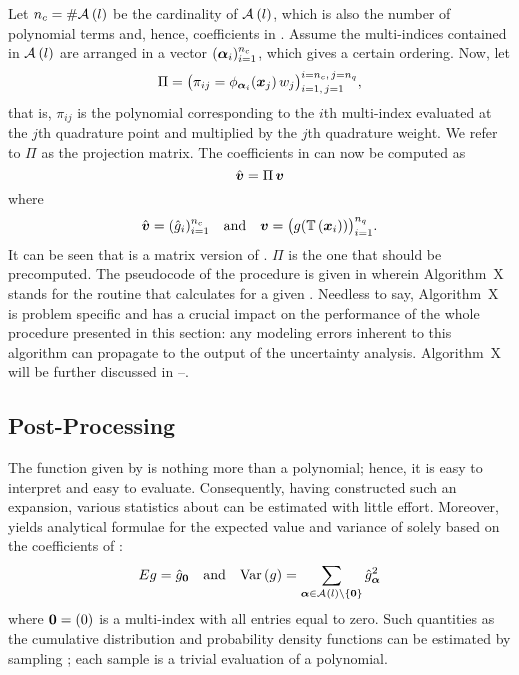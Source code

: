 Let ${n_{c}} = \# \mathcal{A}_{}\left(l\right)$ be the cardinality of
$\mathcal{A}_{}\left(l\right)$, which is also the number of polynomial terms and, hence,
coefficients in . Assume the multi-indices
contained in $\mathcal{A}_{}\left(l\right)$ are arranged in a vector $(\boldsymbol{\alpha}_i)_{i =
1}^{n_{c}}$, which gives a certain ordering. Now, let
\[
  \Pi = \big( \pi_{ij} = \phi_{\boldsymbol{\alpha}_i}(\boldsymbol{x}_j) \, w_j \big)_{i = 1, \, j = 1}^{i = {n_{c}}, \, j = {n_{q}}},
\]
that is, $\pi_{ij}$ is the polynomial corresponding to the $i$th multi-index
evaluated at the $j$th quadrature point and multiplied by the $j$th quadrature
weight. We refer to $\Pi$ as the projection matrix. The coefficients in
 can now be computed as
\[
  \hat{\boldsymbol{v}} = \Pi \, \boldsymbol{v}
\]
where
\[
  \hat{\v{v}} = (\hat{\g}_i)_{i = 1}^\nc \hspace{1em} \text{and} \hspace{1em}
  \v{v} = \big(\g(\transform{\v{x}_i}) \big)_{i = 1}^\nq.
\]
It can be seen that  is a matrix version of
. $\Pi$ is the one that should be precomputed. The
pseudocode of the procedure is given in  wherein
Algorithm~X stands for the routine that calculates \g for a given \vu. Needless
to say, Algorithm~X is problem specific and has a crucial impact on the
performance of the whole procedure presented in this section: any modeling
errors inherent to this algorithm can propagate to the output of the uncertainty
analysis. Algorithm~X will be further discussed in
--.

\subsection{Post-Processing}

The function given by  is nothing more than a
polynomial; hence, it is easy to interpret and easy to evaluate. Consequently,
having constructed such an expansion, various statistics about \g can be
estimated with little effort. Moreover,  yields
analytical formulae for the expected value and variance of \g solely based on
the coefficients of :
\[
  \expectation{\g} = \hat{\g}_{\v{0}} \hspace{1em} \text{and} \hspace{1em}
  \variance{\g} = \sum_{\multiindex \in \multiindices{l} \setminus \{ \v{0} \}} \hat{\g}_{\multiindex}^2
\]
where $\boldsymbol{0} = (0)$ is a multi-index with all entries equal to zero. Such
quantities as the cumulative distribution and probability density functions can
be estimated by sampling ; each sample is a trivial
evaluation of a polynomial.

